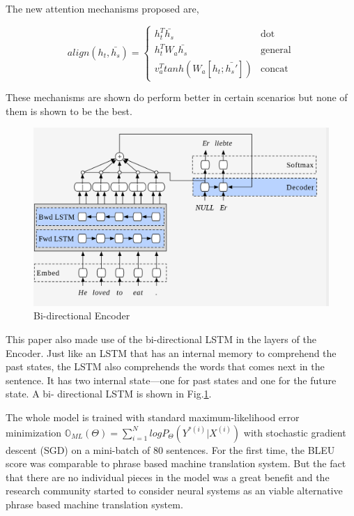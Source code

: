 \documentclass[a4paper]{article}
\begin{document}
The new attention mechanisms proposed are,


\begin{equation*}
  align(h_t,\bar{h_s}) = \begin{cases}
    h_t^T\bar{h_s} & \text{dot} \\
    h_t^TW_a\bar{h_s} & \text{general} \\
    v_a^T tanh(W_a[h_t;\bar{h_s'}]) & \text{concat}
  \end{cases}
\end{equation*}


These mechanisms  are shown  do perform better  in certain scenarios but none of
them is shown to be the best.


\begin{figure}
  \includegraphics[width=0.9\linewidth]{img/birnn.png}
  \caption{Bi-directional Encoder}
  \label{fig:birnn}
\end{figure}


This paper  also made  use of  the  bi-directional  LSTM  in  the layers  of the
Encoder. Just like  an  LSTM that has an internal memory to comprehend  the past
states, the LSTM also comprehends the words that comes next in the sentence.  It
has two internal state---one for past states and one for the future state. A bi-
directional LSTM is shown in Fig.\ref{fig:birnn}.

The whole model is trained with standard maximum-likelihood  error  minimization
$\mathbb{O}_{ML}(\Theta) = \sum_{i=1}^N log P_\Theta(Y^{*(i)} |  X^{(i)}) $ with
stochastic gradient descent (SGD) on a mini-batch of 80 sentences. For the first
time, the BLEU score was comparable to phrase based machine  translation system.
But  the fact  that there  are  no  individual pieces  in the  model was a great
benefit and the  research  community started to  consider  neural systems as  an
viable alternative phrase based machine translation system.
\end{document}
